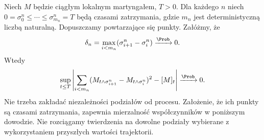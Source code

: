 \begin{twierdzenie}
\label{thm:bracket-random-partitions}
Niech $M$ będzie ciągłym lokalnym martyngałem,
$T>0$. Dla każdego $n$ niech
$0=\sigma_0^n\le\cdots\le\sigma_{m_n}^n=T$
będą czasami zatrzymania, gdzie $m_n$ jest
deterministyczną liczbą naturalną. Dopuszczamy
powtarzające się punkty. Załóżmy, że
\[
\delta_n=\max_{i<m_n}(\sigma_{i+1}^n-\sigma_i^n)
\xrightarrow{\Prob}0.
\]
Wtedy
\[
\sup_{t\le T}\left|
\sum_{i<m_n}(M_{t\wedge\sigma_{i+1}^n}
-M_{t\wedge\sigma_i^n})^2-[M]_t
\right|\xrightarrow{\Prob}0.
\]
Nie trzeba zakładać niezależności podziałów od procesu.
Założenie, że ich punkty są czasami zatrzymania,
zapewnia mierzalność współczynników w poniższym dowodzie.
Nie rozciągamy twierdzenia na dowolne podziały wybierane
z wykorzystaniem przyszłych wartości trajektorii.
\end{twierdzenie}
